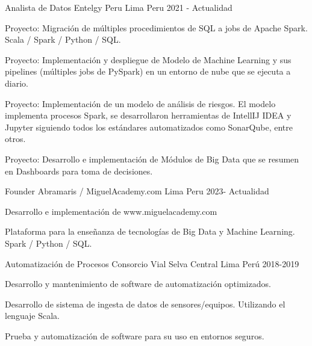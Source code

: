 

\begin{cventries}

  \cventry
    {Analista de Datos} %
    {Entelgy Peru} %
    {Lima Peru} %
    {2021 - Actualidad} %
    {
      \begin{cvitems} %
        \item {Proyecto: Migraci\'on de m\'ultiples procedimientos de SQL a jobs de Apache Spark. Scala / Spark / Python / SQL.}
        \item {Proyecto: Implementaci\'on y despliegue de Modelo de Machine Learning y sus pipelines (m\'ultiples jobs de PySpark) en un entorno de nube que se ejecuta a diario.}
        \item {Proyecto: Implementaci\'on de un modelo de an\'alisis de riesgos. El modelo implementa procesos Spark, se desarrollaron herramientas de IntellIJ IDEA y Jupyter siguiendo todos los est\'andares automatizados como SonarQube, entre otros.}
        \item {Proyecto: Desarrollo e implementaci\'on de M\'odulos de Big Data que se resumen en Dashboards para toma de decisiones.}
      \end{cvitems}
    }

  \cventry
  {Founder} %
  {Abramaris / MiguelAcademy.com} %
  {Lima Peru} %
  {2023- Actualidad} %
  {
    \begin{cvitems} %
      \item {Desarrollo e implementaci\'on de www.miguelacademy.com}
      \item {Plataforma para la enseñanza de tecnolog\'ias de Big Data y Machine Learning. Spark / Python / SQL.}
    \end{cvitems}
  }
  \cventry
  {Automatizaci\'on de Procesos} %
  {Consorcio Vial Selva Central} %
  {Lima Per\'u} %
  {2018-2019} %
  {
    \begin{cvitems} %
      \item {Desarrollo y mantenimiento de software de automatizaci\'on optimizados.}
      \item {Desarrollo de sistema de ingesta de datos de sensores/equipos. Utilizando el lenguaje Scala.}
      \item {Prueba y automatizaci\'on de software para su uso en entornos seguros.}
    \end{cvitems}
  }


\end{cventries}
